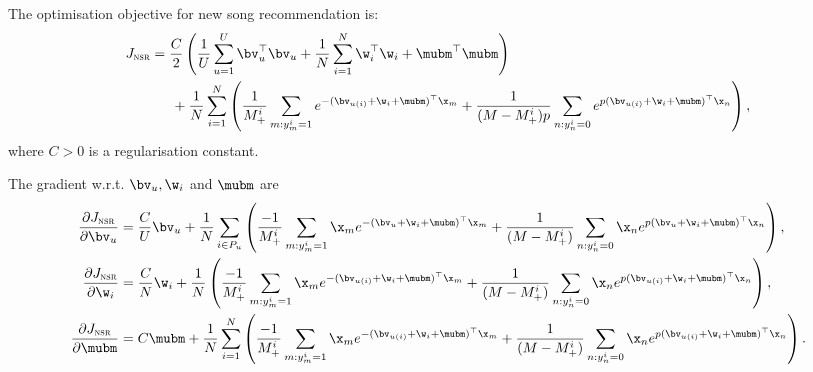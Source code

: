 The optimisation objective for new song recommendation is:
\begin{equation*}
\begin{aligned}
J_\textsc{nsr} &= \frac{C}{2} \left( \frac{1}{U} \sum_{u=1}^U \bv_u^\top \bv_u 
     + \frac{1}{N} \sum_{i=1}^N \w_i^\top \w_i + \mubm^\top \mubm \right) \\
& \hspace{1.5em}
     + \frac{1}{N} \sum_{i=1}^N \left( \frac{1}{M_+^i} \sum_{m: y_m^i = 1} e^{-(\bv_{u(i)} + \w_i + \mubm)^\top \x_m} 
     + \frac{1}{(M - M_+^i) p} \sum_{n: y_n^i = 0} e^{p (\bv_{u(i)} + \w_i + \mubm)^\top \x_n} \right),
\end{aligned}
\end{equation*}
where $C > 0$ is a regularisation constant.


The gradient w.r.t. $\bv_u, \w_i$ and $\mubm$ are
\begin{equation*}
\begin{aligned}
\frac{\partial J_\textsc{nsr}}{\partial \bv_u}
&= \frac{C}{U} \bv_u + \frac{1}{N} \sum_{i \in P_u} \left( 
   \frac{-1}{M_+^i} \sum_{m: y_m^i = 1} \x_m e^{-(\bv_{u} + \w_i + \mubm)^\top \x_m} 
   + \frac{1}{(M - M_+^i)} \sum_{n: y_n^i = 0} \x_n e^{p (\bv_{u} + \w_i + \mubm)^\top \x_n} \right), \\
\frac{\partial J_\textsc{nsr}}{\partial \w_i}
&= \frac{C}{N} \w_i + \frac{1}{N} \left( 
   \frac{-1}{M_+^i} \sum_{m: y_m^i = 1} \x_m e^{-(\bv_{u(i)} + \w_i + \mubm)^\top \x_m} 
   + \frac{1}{(M - M_+^i)} \sum_{n: y_n^i = 0} \x_n e^{p (\bv_{u(i)} + \w_i + \mubm)^\top \x_n} \right), \\
\frac{\partial J_\textsc{nsr}}{\partial \mubm}
&= C \mubm + \frac{1}{N} \sum_{i=1}^N \left( 
   \frac{-1}{M_+^i} \sum_{m: y_m^i = 1} \x_m e^{-(\bv_{u(i)} + \w_i + \mubm)^\top \x_m} 
   + \frac{1}{(M - M_+^i)} \sum_{n: y_n^i = 0} \x_n e^{p (\bv_{u(i)} + \w_i + \mubm)^\top \x_n} \right).
\end{aligned}
\end{equation*}
